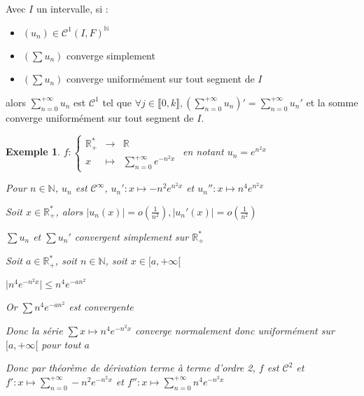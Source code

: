 \documentclass[a4paper,12pt]{book}
\newcommand{\Thr}[2]{\begin{tcolorbox}[sharp corners, colback=white,colframe=red!90!black!75, title=Théorème : #1]#2\end{tcolorbox}}
\newtheorem{Exe}{Exemple}[section]
\def\R{\mathbb{R}}
\def\N{\mathbb{N}}
\begin{document}
\Thr{Théorème de dérivation terme à terme à l'ordre k}{Avec $I$ un intervalle, si :\begin{itemize}\item $(u_n)\in\mathcal{C}^1(I,F)^\N$ \item $(\sum u_n)$ converge simplement \item $(\sum u_n)$ converge uniformément sur tout segment de $I$\end{itemize} alors $\sum\limits_{n=0}^{+\infty}u_n$ est $\mathcal{C}^1$ tel que $\forall j\in\llbracket0,k\rrbracket, \left(\sum\limits_{n=0}^{+\infty}u_n\right)'=\sum\limits_{n=0}^{+\infty}u_n'$ et la somme converge uniformément sur tout segment de $I$.}
\begin{Exe}
$f:\left\{\begin{array}{rcl}\R_+^* & \to & \R \\ x & \mapsto & \sum\limits_{n=0}^{+\infty}e^{-n^2x}\end{array}\right.$ en notant $u_n=e^{n^2x}$ \par Pour $n\in\N$, $u_n$ est $\mathcal{C}^\infty$, $u_n':x\mapsto -n^2e^{n^2x}$ et $u_n'':x\mapsto n^4e^{n^2x}$ \par Soit $x\in\R_+^*$, alors $\vert u_n(x)\vert=o(\frac{1}{n^2}), \vert u_n'(x)\vert=o(\frac{1}{n^2})$ \par $\sum u_n$ et $\sum u_n'$ convergent simplement sur $\R_+^*$ \par Soit $a\in\R_+^*$, soit $n\in\N$, soit $x\in[a,+\infty[$ \par $\vert n^4e^{-n^2x}\vert\leq n^4e^{-an^2}$ \par Or $\sum n^4e^{-an^2}$ est convergente
\par Donc la série $\sum x\mapsto n^4e^{-n^2x}$ converge normalement donc uniformément sur $[a,+\infty[$ pour tout $a$ \par Donc par théorème de dérivation terme à terme d'ordre 2, $f$ est $\mathcal{C}^2$ et $f':x\mapsto \sum\limits_{n=0}^{+\infty}-n^2e^{-n^2x}$ et $f'':x\mapsto \sum\limits_{n=0}^{+\infty}n^4e^{-n^2x}$
\end{Exe}
\end{document}
